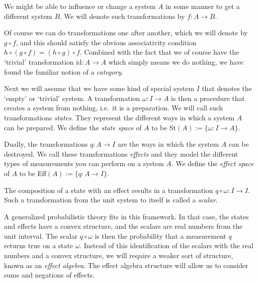 \documentclass[b5paper,onecolumn,12pt,accepted=2019-05-03, issue=1, volume=1, shorttitle=papers/compositionality-1-1]{compositionalityarticle}
\numberwithin{counter}{section}
\newcommand{\id}{\text{id}}
\begin{document}
We might be able to influence or change a system $A$ in some manner to get a different system $B$. We will denote such transformations by $f:A\rightarrow B$.

Of course we can do transformations one after another, which we will denote by $g\circ f$, and this should satisfy the obvious associativity condition $h\circ(g\circ f) = (h\circ g)\circ f$. Combined with the fact that we of course have the `trivial' transformation $\id: A\rightarrow A$ which simply means we do nothing, we have found the familiar notion of a \emph{category}.

Next we will assume that we have some kind of special system $I$ that denotes the `empty' or `trivial' system. A transformation $\omega:I\rightarrow A$ is then a procedure that creates a system from nothing, i.e.\ it is a preparation. We will call such transformations \emph{states}. They represent the different ways in which a system $A$ can be prepared. We define the \emph{state space} of $A$ to be St$(A):=\{\omega: I\rightarrow A\}$.

Dually, the transformations $q:A\rightarrow I$ are the ways in which the system $A$ can be destroyed. We call these transformations \emph{effects} and they model the different types of measurements you can perform on a system $A$. We define the \emph{effect space} of $A$ to be Eff$(A):=\{q:A\rightarrow I\}$.

The composition of a state with an effect results in a transformation $q\circ\omega: I\rightarrow I$. Such a transformation from the unit system to itself is called a \emph{scalar}. 

A generalized probabilistic theory fits in this framework. In that case, the states and effects have a convex structure, and the scalars are real numbers from the unit interval. The scalar $q\circ \omega$ is then the probability that a measurement $q$ returns true on a state $\omega$. 
Instead of this identification of the scalars with the real numbers and a convex structure, we will require a weaker sort of structure, known as an \emph{effect algebra}. The effect algebra structure will allow us to consider sums and negations of effects.
\end{document}
